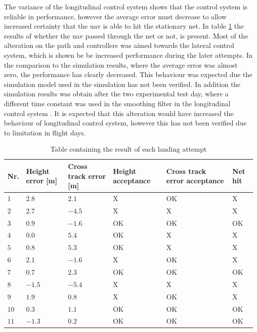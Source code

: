 The variance of the longitudinal control system shows that the control system is reliable in performance, however the average error must decrease to allow increased certainty that the \gls{uav} is able to hit the stationary net. In table \ref{tb:Day1LandingAttempt} the results of whether the \gls{uav} passed through the net or not, is present. Most of the alteration on the path and controllers was aimed towards the lateral control system, which is shown be be increased performance during the later attempts. In the comparison to the simulation results, where the average error was almost zero, the performance has clearly decreased. This behaviour was expected due the simulation model used in the simulation has not been verified. In addition the simulation results was obtain after the two experimental test day, where a different time constant was used in the smoothing filter in the longitudinal control system \citep{Sigurd}. It is expected that this alteration would have increased the behaviour of longitudinal control system, however this has not been verified due to limitation in flight days.
\begin{table}[H]
\centering
\begin{tabular}{| p{0.5cm} | p{1cm} | p{1cm} | p{3.5cm} | p{3cm} | p{1cm} |}
\hline
\textbf{Nr.}	& \textbf{Height error [m]}	& \textbf{Cross track error [m]}& \textbf{Height acceptance}& \textbf{Cross track error acceptance}	& \textbf{Net hit}\\ \hline
$1$				& $2.8$		& $2.1$		& X								& OK									& X					\\ \hline
$2$				& $2.7$		& $-4.5$	& X								& X										& X					\\ \hline
$3$				& $0.9$		& $-1.6$	& OK							& OK									& OK				\\ \hline
$4$				& $0.0$		& $5.4$		& OK							& X										& X					\\ \hline
$5$				& $0.8$		& $5.3$		& OK							& X										& X					\\ \hline
$6$				& $2.1$		& $-1.6$	& X								& OK									& X					\\ \hline
$7$				& $0.7$		& $2.3$		& OK							& OK									& OK				\\ \hline
$8$				& $-1.5$	& $-5.4$	& X								& X										& X					\\ \hline
$9$				& $1.9$		& $0.8$		& X								& OK									& X					\\ \hline
$10$			& $0.3$	& $1.1$		& OK							& OK									& OK				\\ \hline
$11$			& $-1.3$	& $0.2$		& OK							& OK									& OK				\\ \hline
\end{tabular}
\caption{Table containing the result of each landing attempt}
\label{tb:Day1LandingAttempt}
\end{table}
